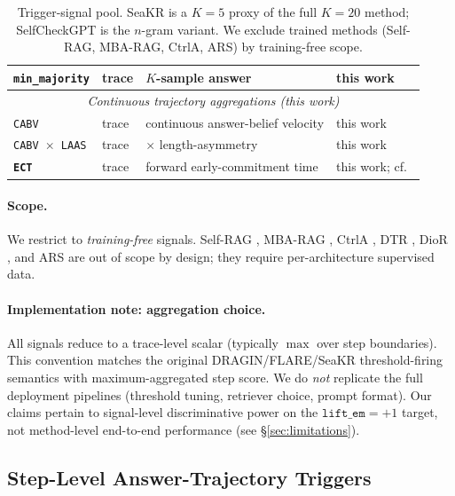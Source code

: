 \documentclass[11pt]{article}
\begin{document}
\begin{table}[t]
\begin{tabular}{@{}llll@{}}
\texttt{min\_majority}          & trace       & $K$-sample answer & this work \\
\midrule
\multicolumn{4}{c}{\textit{Continuous trajectory aggregations (this work)}} \\
\midrule
\texttt{CABV}                   & trace       & continuous answer-belief velocity & this work \\
\texttt{CABV $\times$ LAAS}     & trace       & $\times$ length-asymmetry          & this work \\
\textbf{\texttt{ECT}}            & trace       & forward early-commitment time      & this work; cf.\ \citealp{Datta_DecideEarlyExplainLater} \\
\bottomrule
\end{tabular}
\caption{Trigger-signal pool. SeaKR is a $K{=}5$ proxy of the full $K{=}20$
method; SelfCheckGPT is the $n$-gram variant. We exclude trained methods
(Self-RAG, MBA-RAG, CtrlA, ARS) by training-free scope.}
\label{tab:pool}
\end{table}

\paragraph{Scope.} We restrict to \emph{training-free} signals. Self-RAG
\citep{Asai_SelfRAG}, MBA-RAG \citep{Tang_MBARAG}, CtrlA \citep{Liu_CtrlA},
DTR \citep{Chen_DTR}, DioR \citep{Guo_DioR}, and ARS
\citep{Zhang_AnswerAgreementRepresentationShaping} are out of scope by design;
they require per-architecture supervised data.

\paragraph{Implementation note: aggregation choice.} All signals reduce to a
trace-level scalar (typically $\max$ over step boundaries). This convention
matches the original DRAGIN/FLARE/SeaKR threshold-firing semantics with
maximum-aggregated step score. We do \emph{not} replicate the full deployment
pipelines (threshold tuning, retriever choice, prompt format). Our claims
pertain to signal-level discriminative power on the $\texttt{lift\_em}=+1$
target, not method-level end-to-end performance (see \S\ref{sec:limitations}).

\subsection{Step-Level Answer-Trajectory Triggers}
\label{sec:methods-aid}
\end{document}
